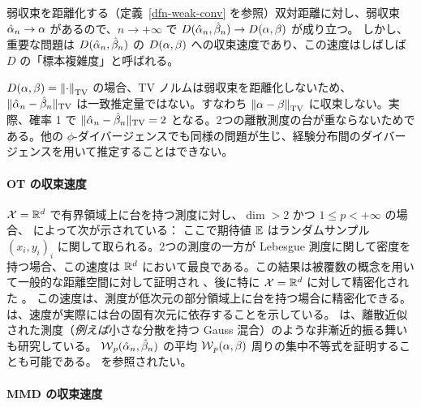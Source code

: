 弱収束を距離化する（定義~\ref{dfn-weak-conv} を参照）双対距離に対し、弱収束 $\hat{\alpha}_n \rightarrow \alpha$ があるので、$n \rightarrow +\infty$ で $D(\hat {\alpha}_n,\hat {\beta}_n) \rightarrow D(\alpha,\beta)$ が成り立つ。
%
しかし、重要な問題は $D(\hat {\alpha}_n,\hat {\beta}_n)$ の $D(\alpha,\beta)$ への収束速度であり、この速度はしばしば $D$ の「標本複雑度」と呼ばれる。

$D(\alpha,\beta) = \left\| \cdot \right\|_{\operatorname{TV}}$ の場合、TV ノルムは弱収束を距離化しないため、$\| \hat {\alpha}_n - \hat {\beta}_n \|_{\operatorname{TV}}$ は一致推定量ではない。すなわち $\left\| \alpha-\beta \right\|_{\operatorname{TV}}$ に収束しない。実際、確率 1 で $\| \hat {\alpha}_n - \hat {\beta}_n \|_{\operatorname{TV}}=2$ となる。2つの離散測度の台が重ならないためである。他の $\phi$-ダイバージェンスでも同様の問題が生じ、経験分布間のダイバージェンスを用いて推定することはできない。


\paragraph{OT の収束速度}

$\mathcal{X}=\mathbb{R}^d$ で有界領域上に台を持つ測度に対し、$\dim>2$ かつ $1 \leq p < +\infty$ の場合、\citep{dudley1969speed} によって次が示されている：
ここで期待値 $\mathbb{E}$ はランダムサンプル $(x_i,y_i)_i$ に関して取られる。2つの測度の一方が Lebesgue 測度に関して密度を持つ場合、この速度は $\mathbb{R}^d$ において最良である。この結果は被覆数の概念を用いて一般的な距離空間に対して証明され \citep{dudley1969speed}、後に特に $\mathcal{X}=\mathbb{R}^d$ に対して精密化された \citep{dereich2013constructive,fournier2015rate}。
この速度は、測度が低次元の部分領域上に台を持つ場合に精密化できる。\citet{weed2017sharp} は、速度が実際には台の固有次元に依存することを示している。\citeauthor{weed2017sharp} は、離散近似された測度（\emph{例えば}小さな分散を持つ Gauss 混合）のような非漸近的振る舞いも研究している。
%
$\operatorname{\mathcal{W}}_p(\hat {\alpha}_n,\hat {\beta}_n)$ の平均 $\operatorname{\mathcal{W}}_p(\alpha,\beta)$ 周りの集中不等式を証明することも可能である。\citep{bolley2007quantitative,boissard2011simple,weed2017sharp} を参照されたい。

\paragraph{MMD の収束速度}

